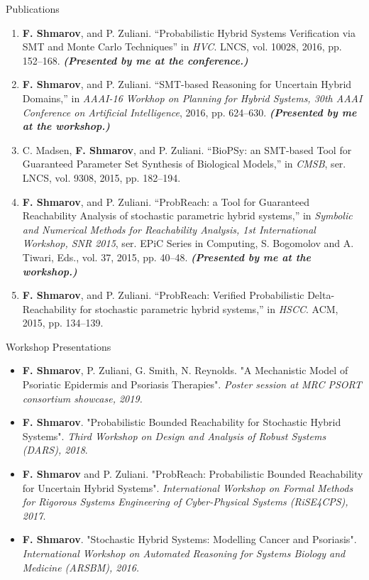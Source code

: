 \documentclass{resume} %
\begin{document}
\begin{rSection}{Publications}
\begin{enumerate}[resume]
	\item {\bf F. Shmarov}, and P. Zuliani. ``Probabilistic Hybrid Systems Verification via 
	SMT and Monte Carlo Techniques'' in {\em HVC}. LNCS, vol. 10028, 2016, pp. 152--168. 
	{\bf {\em (Presented by me at the conference.)}}

	\item {\bf F. Shmarov}, and P. Zuliani. ``SMT-based Reasoning for Uncertain Hybrid Domains,'' 
	in {\em AAAI-16 Workhop on Planning for Hybrid Systems, 
	30th AAAI Conference on Artificial Intelligence}, 2016, pp. 624--630.
	{\bf {\em (Presented by me at the workshop.)}}

	\item C. Madsen, {\bf F. Shmarov}, and P. Zuliani. ``BioPSy: an SMT-based Tool for 
	Guaranteed Parameter Set Synthesis of Biological Models,'' in {\em CMSB},
	ser. LNCS, vol. 9308, 2015, pp. 182--194.

	\item {\bf F. Shmarov}, and P. Zuliani. ``ProbReach: a Tool for 
	Guaranteed Reachability Analysis of stochastic parametric hybrid systems,''
	in {\em Symbolic and Numerical Methods for Reachability Analysis, 1st International Workshop, SNR 2015}, 
	ser. EPiC Series in Computing, S. Bogomolov and A. Tiwari, Eds., vol. 37, 2015, pp. 40--48.
	{\bf {\em (Presented by me at the workshop.)}}

	\item {\bf F. Shmarov}, and P. Zuliani. ``ProbReach: Verified Probabilistic 
	Delta-Reachability for stochastic parametric hybrid systems,''
	in {\em HSCC}. ACM, 2015, pp. 134--139.
\end{enumerate}
\end{rSection}


\begin{rSection}{Workshop Presentations}
\begin{itemize}

	\item {\bf F. Shmarov}, P. Zuliani, G. Smith, N. Reynolds. "A Mechanistic Model of Psoriatic
	Epidermis and Psoriasis Therapies". {\em Poster session at MRC PSORT consortium showcase, 2019.}

	\item {\bf F. Shmarov}. "Probabilistic Bounded Reachability for Stochastic Hybrid Systems". 
	{\em Third Workshop on Design and Analysis of Robust Systems (DARS), 2018}.

	\item {\bf F. Shmarov} and P. Zuliani. "ProbReach: Probabilistic Bounded 
	Reachability for Uncertain Hybrid Systems". {\em International Workshop on
	Formal Methods for Rigorous Systems Engineering of Cyber-Physical Systems (RiSE4CPS), 2017}.

	\item {\bf F. Shmarov}. "Stochastic Hybrid Systems: Modelling Cancer and Psoriasis". 
	{\em International Workshop on Automated Reasoning for Systems Biology and Medicine (ARSBM), 2016.}

\end{itemize}	
\end{rSection}
\end{document}
